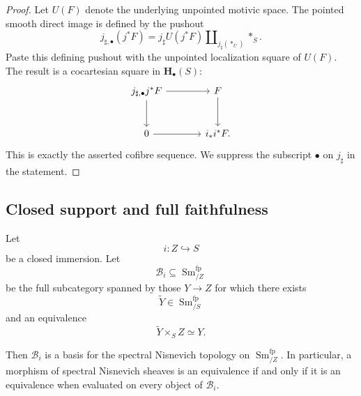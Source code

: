 \begin{proof}
Let \(U(F)\) denote the underlying unpointed motivic space.  The pointed
smooth direct image is defined by the pushout
\[
    j_{\sharp,\bullet}(j^*F)
    =
    j_\sharp U(j^*F)
    \amalg_{j_\sharp(*_U)}
    *_S.
\]
Paste this defining pushout with the unpointed localization square of
\(U(F)\).  The result is a cocartesian square in
\(\mathbf H_\bullet(S)\):
\[
\begin{tikzcd}[column sep=large, row sep=large]
    j_{\sharp,\bullet}j^*F
        \arrow[r]
        \arrow[d]
    &
    F
        \arrow[d]
    \\
    0
        \arrow[r]
    &
    i_*i^*F.
\end{tikzcd}
\]
This is exactly the asserted cofibre sequence.  We suppress the
subscript \(\bullet\) on \(j_\sharp\) in the statement.
\end{proof}

\subsection{Closed support and full faithfulness}

\begin{lemma}
\label{lem:closed-liftable-nisnevich-basis}
Let
\[
    i
    \colon
    Z
    \hookrightarrow
    S
\]
be a closed immersion.  Let
\[
    \mathcal B_i
    \subseteq
    \operatorname{Sm}^{\mathrm{fp}}_{/Z}
\]
be the full subcategory spanned by those \(Y\to Z\) for which there
exists
\[
    \widetilde Y
    \in
    \operatorname{Sm}^{\mathrm{fp}}_{/S}
\]
and an equivalence
\[
    \widetilde Y\times_SZ
    \simeq
    Y.
\]

Then \(\mathcal B_i\) is a basis for the spectral Nisnevich topology on
\(\operatorname{Sm}^{\mathrm{fp}}_{/Z}\).  In particular, a morphism of
spectral Nisnevich sheaves is an equivalence if and only if it is an
equivalence when evaluated on every object of \(\mathcal B_i\).
\end{lemma}

